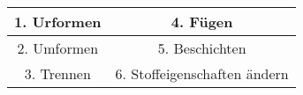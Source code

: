 \begin{scriptsize}
    \begin{tabular}{|c|c|}
     \hline
     1. Urformen & 4. Fügen  \\
     \hline
     2. Umformen & 5. Beschichten \\
     \hline
     3. Trennen & 6. Stoffeigenschaften ändern\\
     \hline
    \end{tabular}
 \end{scriptsize}